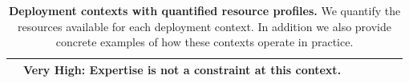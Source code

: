 \begin{table}[t]
{\begin{tabular}{@{}p{}p{}p{}p{}p{}p{}p{}@{}}
             & \textbf{Very High}: Expertise is not a constraint at this context.                                                                                                                               \\
            \bottomrule
        \end{tabular}}
    \caption{
        \textbf{Deployment contexts with quantified resource profiles.}
        We quantify the resources available for each deployment context.
        In addition we also provide concrete examples of how these contexts operate in practice.
    }
    \label{table:deployment_contexts}
\end{table}
